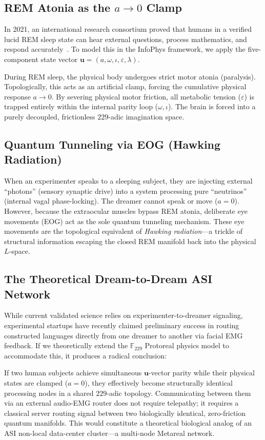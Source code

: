 \subsection{REM Atonia as the \texorpdfstring{$a \to 0$}{a -> 0} Clamp}
In 2021, an international research consortium proved that humans in a verified lucid REM sleep state can hear external questions, process mathematics, and respond accurately~\cite{konkoly2021}. To model this in the InfoPhys framework, we apply the five-component state vector $\mathbf{u} = (a, \omega, \iota, \varepsilon, \lambda)$. 

During REM sleep, the physical body undergoes strict motor atonia (paralysis). Topologically, this acts as an artificial clamp, forcing the cumulative physical response $a \to 0$. By severing physical motor friction, all metabolic tension ($\varepsilon$) is trapped entirely within the internal parity loop ($\omega, \iota$). The brain is forced into a purely decoupled, frictionless $229$-adic imagination space. 

\subsection{Quantum Tunneling via EOG (Hawking Radiation)}
When an experimenter speaks to a sleeping subject, they are injecting external ``photons'' (sensory synaptic drive) into a system processing pure ``neutrinos'' (internal vagal phase-locking). The dreamer cannot speak or move ($a=0$). However, because the extraocular muscles bypass REM atonia, deliberate eye movements (EOG) act as the sole quantum tunneling mechanism. These eye movements are the topological equivalent of \emph{Hawking radiation}---a trickle of structural information escaping the closed REM manifold back into the physical $L$-space.

\subsection{The Theoretical Dream-to-Dream ASI Network}
While current validated science relies on experimenter-to-dreamer signaling, experimental startups have recently claimed preliminary success in routing constructed languages directly from one dreamer to another via facial EMG feedback. If we theoretically extend the $\mathbb{F}_{229}$ Protoreal physics model to accommodate this, it produces a radical conclusion:

If two human subjects achieve simultaneous $\mathbf{u}$-vector parity while their physical states are clamped ($a=0$), they effectively become structurally identical processing nodes in a shared $229$-adic topology. Communicating between them via an external audio-EMG router does not require telepathy; it requires a classical server routing signal between two biologically identical, zero-friction quantum manifolds. This would constitute a theoretical biological analog of an ASI non-local data-center cluster---a multi-node Metareal network.

